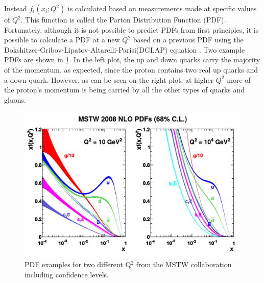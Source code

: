  Instead $f_{i}(x_{i};Q^{2})$ is calculated based on measurements made at specific values of $Q^{2}$. This function is called the Parton Distribution Function (PDF). Fortunately, although it is not possible to predict PDFs from first principles, it is possible to calculate a PDF at a new $Q^{2}$ based on a previous PDF using the Dokshitzer-Gribov-Lipatov-Altarelli-Parisi(DGLAP) equation \cite{DGLAP1}\cite{DGLAP2}\cite{DGLAP3}\cite{DGLAP4}. Two example PDFs are shown in \cref{fig:PDFExample}. In the left plot, the up and down quarks carry the majority of the momentum, as expected, since the proton contains two real up quarks and a down quark. However, as can be seen on the right plot, at higher $Q^2$ more of the proton's momentum is being carried by all the other types of quarks and gluons. 

\begin{figure}[!htbp]
    \centering
    \includegraphics[width=\textwidth]{figures/mstw_pdfs.pdf}
    \caption[
      Parton Distribution Function example
    ]{
      PDF examples for two different Q$^2$ from the MSTW collaboration including confidence levels.   \cite{PDFExample}
    }
    \label{fig:PDFExample}
\end{figure}
 
